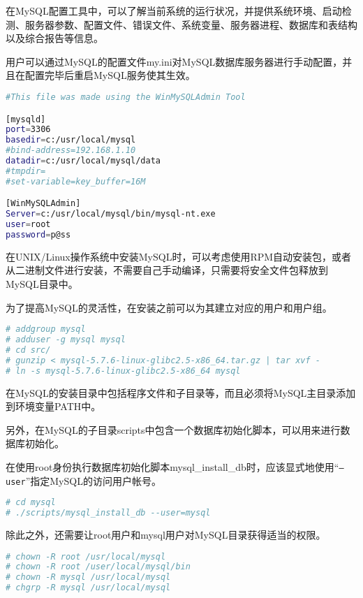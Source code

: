 在MySQL配置工具中，可以了解当前系统的运行状况，并提供系统环境、启动检测、服务器参数、配置文件、错误文件、系统变量、服务器进程、数据库和表结构以及综合报告等信息。

用户可以通过MySQL的配置文件my.ini对MySQL数据库服务器进行手动配置，并且在配置完毕后重启MySQL服务使其生效。

\begin{lstlisting}[language=bash]
#This file was made using the WinMySQLAdmin Tool

[mysqld]
port=3306
basedir=c:/usr/local/mysql
#bind-address=192.168.1.10
datadir=c:/usr/local/mysql/data
#tmpdir=
#set-variable=key_buffer=16M

[WinMySQLAdmin]
Server=c:/usr/local/mysql/bin/mysql-nt.exe
user=root
password=p@ss
\end{lstlisting}

在UNIX/Linux操作系统中安装MySQL时，可以考虑使用RPM自动安装包，或者从二进制文件进行安装，不需要自己手动编译，只需要将安全文件包释放到MySQL目录中。

为了提高MySQL的灵活性，在安装之前可以为其建立对应的用户和用户组。



\begin{lstlisting}[language=bash]
# addgroup mysql
# adduser -g mysql mysql
# cd src/
# gunzip < mysql-5.7.6-linux-glibc2.5-x86_64.tar.gz | tar xvf -
# ln -s mysql-5.7.6-linux-glibc2.5-x86_64 mysql
\end{lstlisting}

在MySQL的安装目录中包括程序文件和子目录等，而且必须将MySQL主目录添加到环境变量PATH中。

另外，在MySQL的子目录scripts中包含一个数据库初始化脚本，可以用来进行数据库初始化。

在使用root身份执行数据库初始化脚本mysql\_install\_db时，应该显式地使用“\texttt{--user}”指定MySQL的访问用户帐号。


\begin{lstlisting}[language=bash]
# cd mysql
# ./scripts/mysql_install_db --user=mysql
\end{lstlisting}

除此之外，还需要让root用户和mysql用户对MySQL目录获得适当的权限。

\begin{lstlisting}[language=bash]
# chown -R root /usr/local/mysql
# chown -R root /user/local/mysql/bin
# chown -R mysql /usr/local/mysql
# chgrp -R mysql /usr/local/mysql
\end{lstlisting}

